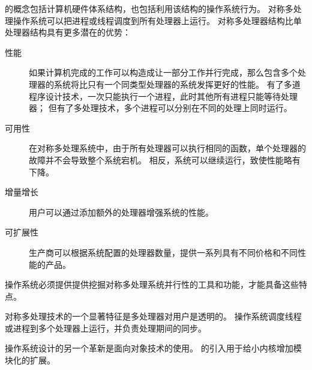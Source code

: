 {    的概念包括计算机硬件体系结构，也包括利用该结构的操作系统行为。
    对称多处理操作系统可以把进程或线程调度到所有处理器上运行。
    对称多处理器结构比单处理器结构具有更多潜在的优势：

    \begin{description}
        \item[性能]
        {
            如果计算机完成的工作可以构造成让一部分工作并行完成，那么包含多个处理器的系统将比只有一个同类型处理器的系统发挥更好的性能。
            有了多道程序设计技术，一次只能执行一个进程，此时其他所有进程只能等待处理器；
            但有了多处理技术，多个进程可以分别在不同的处理上同时运行。
        }
        \item[可用性]
        {
            在对称多处理系统中，由于所有处理器可以执行相同的函数，单个处理器的故障并不会导致整个系统宕机。
            相反，系统可以继续运行，致使性能略有下降。
        }
        \item[增量增长] 用户可以通过添加额外的处理器增强系统的性能。
        \item[可扩展性] 生产商可以根据系统配置的处理器数量，提供一系列具有不同价格和不同性能的产品。
    \end{description}

    操作系统必须提供提供挖掘对称多处理系统并行性的工具和功能，才能具备这些特点。

    对称多处理技术的一个显著特征是多处理器对用户是透明的。
    操作系统调度线程或进程到多个处理器上运行，并负责处理期间的同步。

    操作系统设计的另一个革新是面向对象技术的使用。
    的引入用于给小内核增加模块化的扩展。
}

